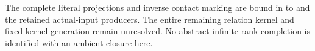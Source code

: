 The complete literal projections and inverse contact marking are bound
in 
to 
and the retained actual-input producers. The entire remaining relation
kernel and fixed-kernel generation remain unresolved. No abstract
infinite-rank completion is identified with an ambient closure here.
